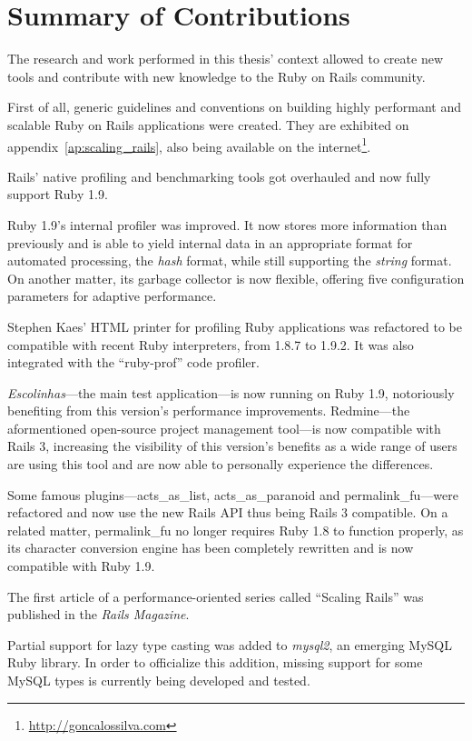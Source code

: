 \section{Summary of Contributions}
The research and work performed in this thesis' context allowed to create new tools and contribute with new knowledge to the Ruby on Rails community.

First of all, generic guidelines and conventions on building highly performant and scalable Ruby on Rails applications were created. They are exhibited on appendix~\ref{ap:scaling_rails}, also being available on the internet\footnote{\url{http://goncalossilva.com}}.

Rails' native profiling and benchmarking tools got overhauled and now fully support Ruby 1.9.

Ruby 1.9's internal profiler was improved. It now stores more information than previously and is able to yield internal data in an appropriate format for automated processing, the \textit{hash} format, while still supporting the \textit{string} format. On another matter, its garbage collector is now flexible, offering five configuration parameters for adaptive performance.

Stephen Kaes' HTML printer for profiling Ruby applications was refactored to be compatible with recent Ruby interpreters, from 1.8.7 to 1.9.2. It was also integrated with the ``ruby-prof'' code profiler.

\textit{Escolinhas}---the main test application---is now running on Ruby 1.9, notoriously benefiting from this version's performance improvements. Redmine---the aformentioned open-source project management tool---is now compatible with Rails 3, increasing the visibility of this version's benefits as a wide range of users are using this tool and are now able to personally experience the differences.

Some famous plugins---acts\_as\_list, acts\_as\_paranoid and permalink\_fu---were refactored and now use the new Rails API thus being Rails 3 compatible. On a related matter, permalink\_fu no longer requires Ruby 1.8 to function properly, as its character conversion engine has been completely rewritten and is now compatible with Ruby 1.9.

The first article of a performance-oriented series called ``Scaling Rails'' was published in the \textit{Rails Magazine}.

Partial support for lazy type casting was added to \textit{mysql2}, an emerging MySQL Ruby library. In order to officialize this addition, missing support for some MySQL types is currently being developed and tested.

